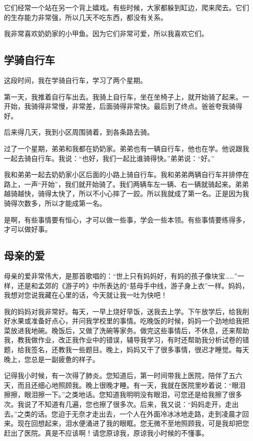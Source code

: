 \documentclass[UTF8,a4paper,titlepage,twoside,10.5pt]{article}
\begin{document}
它们经常一个站在另一个背上嬉戏。有些时候，大家都躲到缸边，爬来爬去。它们的生存能力非常强，所以几天不吃东西，都没有关系。

我非常喜欢奶奶家的小甲鱼。因为它们非常可爱，所以我喜欢它们。

\subsection{学骑自行车}
\label{sec:org973f5e5}

这段时间，我在学骑自行车，学习了两个星期。

第一天，我推着自行车出去。我骑上自行车，坐在坐椅子上，就开始骑了起来。一开始，我骑得非常慢，非常差，后面骑得非常快。最后到了终点。爸爸夸我骑得好。

后来得几天，我到小区周围骑着，到各条路去骑。

过了一个星期，弟弟和我都在奶奶家。弟弟也有一辆自行车，他也在学。他说跟我一起去骑自行车。我说：“也好，我们一起比谁骑得快。”弟弟说：“好。”

我和弟弟一起去奶奶家小区后面的小路上骑自行车。我和弟弟两辆自行车并排停在路上，一声“开始”，我们就开始骑了。我们两辆车左一辆、右一辆就骑起来。弟弟越骑越快，骑得太快了，所以不小心摔了一跤。所以我就成了第一名。正是因为我骑得次数多，所以才能成第一名。

是啊，有些事情要有恒心，才可以做一些事，学会一些本领。有些事情要练得多，才可以做好事。

\subsection{母亲的爱}
\label{sec:org26b5a7c}

母亲的爱非常伟大，是那首歌唱的：“世上只有妈妈好，有妈的孩子像块宝……”一样，还是和孟郊的《游子吟》中所表达的“慈母手中线，游子身上衣”一样。妈妈，我想对您说我藏在心里的话，今天就让我一吐为快吧！

我的妈妈对我非常好。每天，一早上烧好早饭，送我去上学。下午放学后，给我削好水果或准备好点心，并问我学校里的事情。吃晚饭的时候，妈妈一个劲地给我把菜放进我地碗。晚饭后，又做了洗碗等家务。做完这些事情后，不休息，还来帮助我，教我做作业，改正我作业中的错误，辅导我学习，有时还帮助我分析试卷的错题，给我签名，还教我一些题目。晚上，妈妈又干了很多事情，很迟才睡觉。每天晚上，您总是一副疲惫的样子。

记得我小时候，有一次得了肺炎。您知道后，第一时间带我上医院，陪伴了五六天，而且还细心地照顾我。晚上很晚才睡。有一天，我就在医院里吵着说：“眼泪擦擦，眼泪擦一下。”之类地话。您知道我明明没有眼泪，可您还是给我擦了很多次。我说了不知道有几遍，您也擦了很多次。后来，我又说：“妈妈走开，走出去。”之类的话。您迫于无奈才走出去，一个人在外面冷冰冰地走路，走到凌晨才回来。现在回想起来，泪水便涌进了我的眼眶。您无微不至地照顾我，可是我却把您赶出了医院。真是不应该啊！请您原谅我，原谅我小时候的不懂事。
\end{document}
